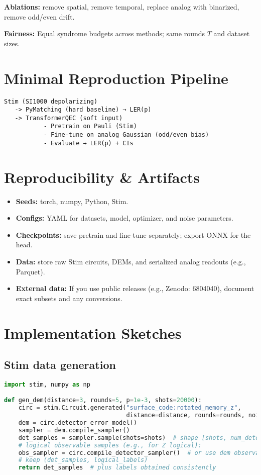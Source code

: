 \documentclass[12pt]{article}
\begin{document}
\textbf{Ablations:} remove spatial, remove temporal, replace analog with binarized, remove odd/even drift.

\textbf{Fairness:} Equal syndrome budgets across methods; same rounds $T$ and dataset sizes.

\section{Minimal Reproduction Pipeline}

\begin{verbatim}
Stim (SI1000 depolarizing)
   -> PyMatching (hard baseline) → LER(p)
   -> TransformerQEC (soft input)
           - Pretrain on Pauli (Stim)
           - Fine-tune on analog Gaussian (odd/even bias)
           - Evaluate → LER(p) + CIs
\end{verbatim}

\section{Reproducibility \& Artifacts}

\begin{itemize}
    \item \textbf{Seeds:} torch, numpy, Python, Stim.
    \item \textbf{Configs:} YAML for datasets, model, optimizer, and noise parameters.
    \item \textbf{Checkpoints:} save pretrain and fine-tune separately; export ONNX for the head.
    \item \textbf{Data:} store raw Stim circuits, DEMs, and serialized analog readouts (e.g., Parquet).
    \item \textbf{External data:} If you use public releases (e.g., Zenodo: 6804040), document exact subsets and any conversions.
\end{itemize}

\section{Implementation Sketches}

\subsection{Stim data generation}

\begin{lstlisting}[language=Python]
import stim, numpy as np

def gen_dem(distance=3, rounds=5, p=1e-3, shots=20000):
    circ = stim.Circuit.generated("surface_code:rotated_memory_z",
                                  distance=distance, rounds=rounds, noise=p)
    dem = circ.detector_error_model()
    sampler = dem.compile_sampler()
    det_samples = sampler.sample(shots=shots)  # shape [shots, num_detectors]
    # logical observable samples (e.g., for Z logical):
    obs_sampler = circ.compile_detector_sampler()  # or use dem observables mapping
    # keep (det_samples, logical_labels)
    return det_samples  # plus labels obtained consistently
\end{lstlisting}
\end{document}

